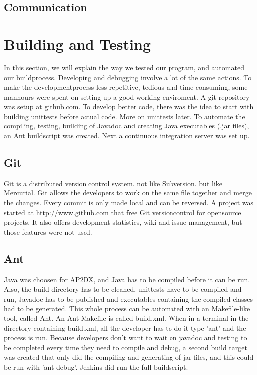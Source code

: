 \documentclass[titlepage, a4paper,10pt]{article}
\begin{document}
\subsection{Communication}


\newpage

\section{Building and Testing}
In this section, we will explain the way we tested our program, and automated our buildprocess. Developing and debugging involve a lot of the same actions. To make the developmentprocess less repetitive, tedious and time consuming, some manhours were spent on setting up a good working enviroment. A git repository was setup at github.com. To develop better code, there was the idea to start with building unittests before actual code. More on unittests later. To automate the compiling, testing, building of Javadoc and creating Java executables (.jar files), an Ant buildscript was created. Next a continuous integration server was set up.

\subsection{Git}
Git is a distributed version control system, not like Subversion, but like Mercurial. Git allows the developers to work on the same file together and merge the changes. Every commit is only made local and can be reversed. A project was started at http://www.github.com that free Git versioncontrol for opensource projects. It also offers development statistics, wiki and issue management, but those features were not used.

\subsection{Ant}
Java was choosen for AP2DX, and Java has to be compiled before it can be run. Also, the build directory has to be cleaned, unittests have to be compiled and run, Javadoc has to be published and executables containing the compiled classes had to be generated. This whole process can be automated with an Makefile-like tool, called Ant. An Ant Makefile is called build.xml. When in a terminal in the directory containing build.xml, all the developer has to do it type 'ant' and the process is run. Because developers don't want to wait on javadoc and testing to be completed every time they need to compile and debug, a second build target was created that only did the compiling and generating of jar files, and this could be run with 'ant debug'. Jenkins did run the full buildscript.
\end{document}
